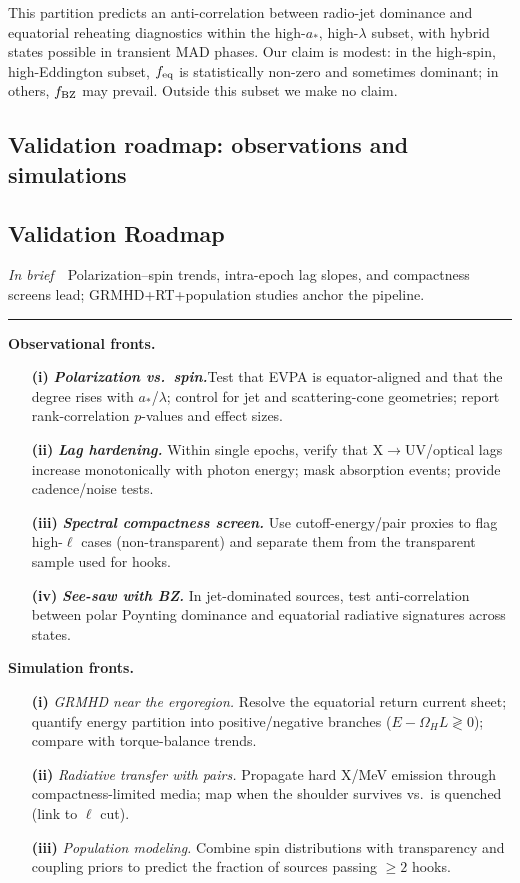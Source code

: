 \documentclass[twocolumn]{aastex701}
\DeclareRobustCommand{\tldr}[1]{%
  \noindent\textit{In brief}\ \textemdash\ #1%
  \par\smallskip
  \noindent\rule{\columnwidth}{0.2pt}\par\medskip
}
\begin{document}
This partition predicts an anti-correlation between radio-jet dominance and equatorial reheating diagnostics within the high-$a_*$, high-$\lambda$ subset, with hybrid states possible in transient MAD phases.
Our claim is modest: in the high-spin, high-Eddington subset, $f_{\rm eq}$ is statistically non-zero and sometimes dominant; in others, $f_{\rm BZ}$ may prevail. Outside this subset we make no claim.

\subsection*{Validation roadmap: observations and simulations}
\subsection{Validation Roadmap}\label{sec:roadmap}
\tldr{Polarization--spin trends, intra-epoch lag slopes, and compactness screens lead; GRMHD+RT+population studies anchor the pipeline.}

\noindent\textbf{Observational fronts.}
\begin{enumerate}
  \item[\textbf{(i)}] \textit{\textbf{Polarization vs.\ spin.}}Test that EVPA is equator-aligned and that the degree rises with $a_\ast$/$\lambda$; control for jet and scattering-cone geometries; report rank-correlation $p$-values and effect sizes.
  \item[\textbf{(ii)}] \textit{\textbf{Lag hardening.}} Within single epochs, verify that X$\to$UV/optical lags increase monotonically with photon energy; mask absorption events; provide cadence/noise tests.
  \item[\textbf{(iii)}] \textit{\textbf{Spectral compactness screen.}} Use cutoff-energy/pair proxies to flag high-$\ell$ cases (non-transparent) and separate them from the transparent sample used for hooks.
  \item[\textbf{(iv)}] \textit{\textbf{See-saw with BZ.}} In jet-dominated sources, test anti-correlation between polar Poynting dominance and equatorial radiative signatures across states.
\end{enumerate}

\noindent\textbf{Simulation fronts.}
\begin{enumerate}
  \item[\textbf{(i)}] \textit{GRMHD near the ergoregion.} Resolve the equatorial return current sheet; quantify energy partition into positive/negative branches ($E-\Omega_H L\gtrless 0$); compare with torque-balance trends.
  \item[\textbf{(ii)}] \textit{Radiative transfer with pairs.} Propagate hard X/MeV emission through compactness-limited media; map when the shoulder survives vs.\ is quenched (link to $\ell$ cut).
  \item[\textbf{(iii)}] \textit{Population modeling.} Combine spin distributions with transparency and coupling priors to predict the fraction of sources passing $\ge 2$ hooks.
\end{enumerate}
\end{document}
